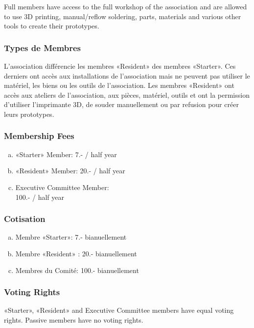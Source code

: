 \documentclass[12pt,a4paper,oneside]{article}
\newcounter{art}
\newcommand{\english}{    \switchcolumn[0]\noindent}
\newcommand{\french}{    \switchcolumn[1]\noindent}
\begin{document}
\begin{paracol}{2}
	Full members have access to the full workshop of the association and are allowed to use 3D printing, manual/reflow soldering, parts, materials and various other tools to create their prototypes.


\french
	\subsubsection{Types de Membres}
	L’association différencie les membres «Resident» des membres «Starter». Ces derniers ont accès aux installations de l’association mais ne peuvent pas utiliser le matériel, les biens ou les outils de l’association. Les membres «Resident» ont accès aux ateliers de l’association, aux pièces, matériel, outils et ont la permission d’utiliser l’imprimante 3D, de souder manuellement ou par refusion pour créer leurs prototypes.

	\vspace{0.5cm}


\english
	\subsubsection{Membership Fees}

	\begin{enumerate}[(a)]
	\item «Starter» Member: 7.- / half year 
	\item «Resident» Member: 20.- / half year 
	\item Executive Committee Member: \\ 100.- / half year 

	\end{enumerate}


\french
	\subsubsection{Cotisation}
	\begin{enumerate}[(a)]
	\item Membre «Starter»: 7.- bianuellement
	\item Membre «Resident» : 20.- bianuellement
	\item Membres du Comité: 100.- bianuellement
	\end{enumerate}


\english
	\subsubsection{Voting Rights}
	 «Starter», «Resident» and Executive Committee members have equal voting rights. Passive members have no voting rights.
	 	\vspace{0.5cm}


\end{paracol}
\end{document}
